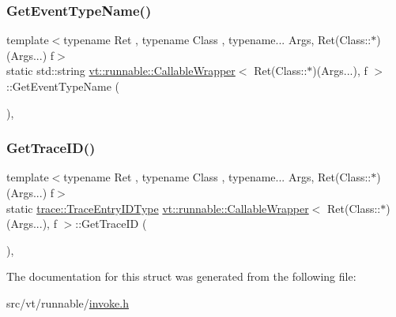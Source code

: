 \subsubsection{\texorpdfstring{Get\+Event\+Type\+Name()}{GetEventTypeName()}}
{\footnotesize\ttfamily template$<$typename Ret , typename Class , typename... Args, Ret(\+Class\+::$\ast$)(\+Args...) f$>$ \\
static std\+::string \hyperlink{structvt_1_1runnable_1_1_callable_wrapper}{vt\+::runnable\+::\+Callable\+Wrapper}$<$ Ret(Class\+::$\ast$)(Args...), f $>$\+::Get\+Event\+Type\+Name (\begin{DoxyParamCaption}{ }\end{DoxyParamCaption})\hspace{0.3cm}{\ttfamily [inline]}, {\ttfamily [static]}}

\mbox{\label{structvt_1_1runnable_1_1_callable_wrapper_3_01_ret_07_class_1_1_5_08_07_args_8_8_8_08_00_01f_01_4_ac995f6f81128dc8df45ce13361122f50}} 
\subsubsection{\texorpdfstring{Get\+Trace\+I\+D()}{GetTraceID()}}
{\footnotesize\ttfamily template$<$typename Ret , typename Class , typename... Args, Ret(\+Class\+::$\ast$)(\+Args...) f$>$ \\
static \hyperlink{namespacevt_1_1trace_a3c14050715ba9eceaeff51fb3de64f2f}{trace\+::\+Trace\+Entry\+I\+D\+Type} \hyperlink{structvt_1_1runnable_1_1_callable_wrapper}{vt\+::runnable\+::\+Callable\+Wrapper}$<$ Ret(Class\+::$\ast$)(Args...), f $>$\+::Get\+Trace\+ID (\begin{DoxyParamCaption}{ }\end{DoxyParamCaption})\hspace{0.3cm}{\ttfamily [inline]}, {\ttfamily [static]}}



The documentation for this struct was generated from the following file\+:\begin{DoxyCompactItemize}
\item 
src/vt/runnable/\hyperlink{invoke_8h}{invoke.\+h}\end{DoxyCompactItemize}
